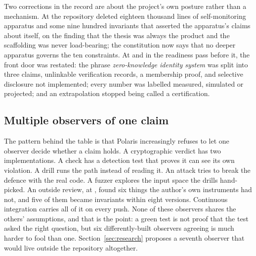 Two corrections in the record are about the project's own posture rather than a mechanism. At
 the repository deleted eighteen thousand lines of self-monitoring apparatus and some
nine hundred invariants that asserted the apparatus's claims about itself, on the finding that the
thesis was always the product and the scaffolding was never load-bearing; the constitution now says
that no deeper apparatus governs the ten constraints. At  and in the readiness pass
before it, the front door was restated: the phrase \emph{zero-knowledge identity system} was split
into three claims, unlinkable verification records, a membership proof, and selective disclosure
not implemented; every number was labelled measured, simulated or projected; and an extrapolation
stopped being called a certification.

\subsection{Multiple observers of one claim}

The pattern behind the table is that Polaris increasingly refuses to let one observer decide
whether a claim holds. A cryptographic verdict has two implementations. A check has a detection
test that proves it can see its own violation. A drill runs the path instead of reading it. An
attack tries to break the defence with the real code. A fuzzer explores the input space the drills
hand-picked. An outside review, at , found six things the author's own instruments had
not, and five of them became invariants within eight versions. Continuous integration carries all of
it on every push. None of these observers shares the others' assumptions, and that is the point: a
green test is not proof that the test asked the right question, but six differently-built
observers agreeing is much harder to fool than one. Section~\ref{sec:research} proposes a seventh
observer that would live outside the repository altogether.
